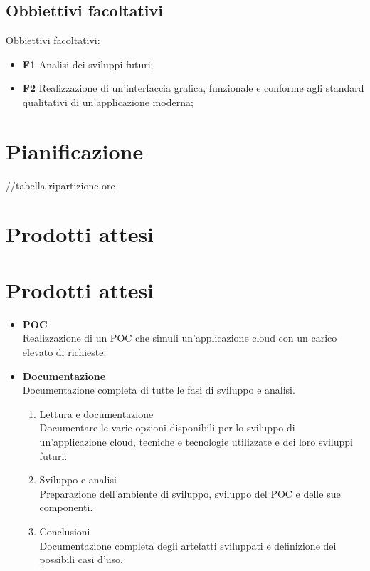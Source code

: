 \subsection{Obbiettivi facoltativi}
Obbiettivi facoltativi:
\begin{itemize}
    \item \textbf{F1} Analisi dei sviluppi futuri;
    \item \textbf{F2} Realizzazione di un'interfaccia grafica, funzionale e conforme agli standard qualitativi di un'applicazione moderna;

\end{itemize}
\section{Pianificazione}
\label{sec:pianificazione}
//tabella ripartizione ore\\

\section{Prodotti attesi}
\section*{Prodotti attesi}
\label{sec:prodotti-attesi}

\begin{itemize}
    \item \textbf{POC} \\
    Realizzazione di un POC che simuli un'applicazione cloud con un carico elevato di richieste.
    \item \textbf{Documentazione} \\
    Documentazione completa di tutte le fasi di sviluppo e analisi.
    \begin{enumerate}
        \item Lettura e documentazione \\
         Documentare le varie opzioni disponibili per lo sviluppo di un'applicazione cloud, tecniche e tecnologie utilizzate e dei loro sviluppi futuri.
        
        \item Sviluppo e analisi \\
        Preparazione dell'ambiente di sviluppo, sviluppo del POC e delle sue componenti.
    
        
        \item Conclusioni \\
        Documentazione completa degli artefatti sviluppati e definizione dei possibili casi d'uso.
    \end{enumerate}
\end{itemize}



